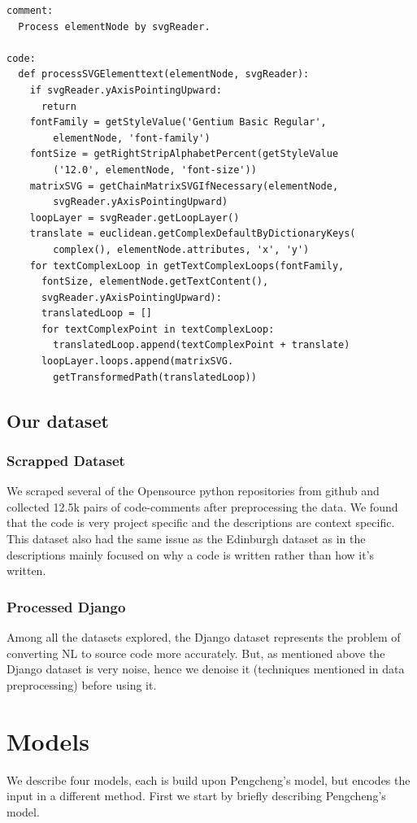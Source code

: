 \documentclass{IEEEtran}
\begin{document}
      \begin{lstlisting}[frame=single,basicstyle=\scriptsize]
comment:
  Process elementNode by svgReader.

code:
  def processSVGElementtext(elementNode, svgReader):
    if svgReader.yAxisPointingUpward:
      return
    fontFamily = getStyleValue('Gentium Basic Regular', 
        elementNode, 'font-family')
    fontSize = getRightStripAlphabetPercent(getStyleValue
        ('12.0', elementNode, 'font-size'))
    matrixSVG = getChainMatrixSVGIfNecessary(elementNode, 
        svgReader.yAxisPointingUpward)
    loopLayer = svgReader.getLoopLayer()
    translate = euclidean.getComplexDefaultByDictionaryKeys(
        complex(), elementNode.attributes, 'x', 'y')
    for textComplexLoop in getTextComplexLoops(fontFamily, 
      fontSize, elementNode.getTextContent(), 
      svgReader.yAxisPointingUpward):
      translatedLoop = []
      for textComplexPoint in textComplexLoop:
        translatedLoop.append(textComplexPoint + translate)
      loopLayer.loops.append(matrixSVG.
        getTransformedPath(translatedLoop))
      \end{lstlisting}

      \subsection{Our dataset}
        \subsubsection{Scrapped Dataset}
        We scraped several of the Opensource python repositories from github and
        collected 12.5k pairs of code-comments after preprocessing the data.
        We found that the code is very project specific and the descriptions are context specific.
        This dataset also had the same issue as the Edinburgh dataset as in the descriptions
        mainly focused on why a code is written rather than how it's written.
        \subsubsection{Processed Django}
        Among all the datasets explored, the Django dataset represents the problem
        of converting NL to source code more accurately. But, as mentioned above
        the Django dataset is very noise, hence we denoise it (techniques
        mentioned in data preprocessing) before using it.

    \section{Models}
    We describe four models, each is build upon Pengcheng's model, but encodes the input in a 
    different method. First we start by briefly describing Pengcheng's model.
\end{document}

